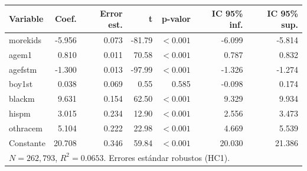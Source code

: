 
\begin{tabular}{lrrrrrr}
\toprule
Variable & Coef. & Error est. & t & p-valor & IC 95\% inf. & IC 95\% sup.\\
\midrule
morekids & -5.956 & 0.073 & -81.79 & $<0.001$ & -6.099 & -5.814\\
agem1 & 0.810 & 0.011 & 70.58 & $<0.001$ & 0.787 & 0.832\\
agefstm & -1.300 & 0.013 & -97.99 & $<0.001$ & -1.326 & -1.274\\
boy1st & 0.038 & 0.069 & 0.55 & 0.585 & -0.098 & 0.174\\
blackm & 9.631 & 0.154 & 62.50 & $<0.001$ & 9.329 & 9.934\\
hispm & 3.015 & 0.234 & 12.90 & $<0.001$ & 2.556 & 3.473\\
othracem & 5.104 & 0.222 & 22.98 & $<0.001$ & 4.669 & 5.539\\
Constante & 20.708 & 0.346 & 59.84 & $<0.001$ & 20.030 & 21.386\\
\midrule
\multicolumn{7}{l}{$N=262{,}793$, $R^2=0.0653$. Errores estándar robustos (HC1).}\\
\bottomrule
\end{tabular}
